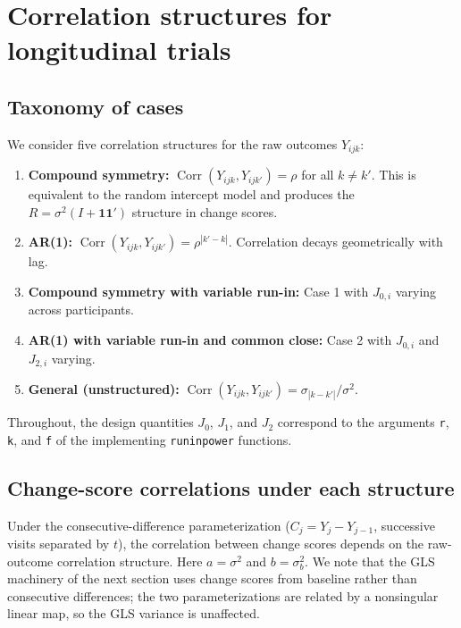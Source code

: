 \documentclass[
  11pt,
]{article}
\begin{document}
\section{Correlation structures for longitudinal trials}\label{correlation-structures-for-longitudinal-trials}

\subsection{Taxonomy of cases}\label{taxonomy-of-cases}

We consider five correlation structures for the
raw outcomes \(Y_{ijk}\):

\begin{enumerate}
\def\labelenumi{\arabic{enumi}.}
\item
  \textbf{Compound symmetry:}
  \(\mathop{\mathrm{Corr}}(Y_{ijk}, Y_{ijk'}) = \rho\) for all
  \(k \ne k'\). This is equivalent to the random
  intercept model and produces the \(R = \sigma^2(I +
  \mathbf{1}\mathbf{1}')\) structure in change scores.
\item
  \textbf{AR(1):}
  \(\mathop{\mathrm{Corr}}(Y_{ijk}, Y_{ijk'}) = \rho^{|k'-k|}\).
  Correlation decays geometrically with lag.
\item
  \textbf{Compound symmetry with variable run-in:}
  Case 1 with \(J_{0,i}\) varying across participants.
\item
  \textbf{AR(1) with variable run-in and common close:}
  Case 2 with \(J_{0,i}\) and \(J_{2,i}\) varying.
\item
  \textbf{General (unstructured):}
  \(\mathop{\mathrm{Corr}}(Y_{ijk}, Y_{ijk'}) = \sigma_{|k-k'|}/\sigma^2\).
\end{enumerate}

Throughout, the design quantities \(J_0\), \(J_1\), and
\(J_2\) correspond to the arguments \texttt{r}, \texttt{k}, and \texttt{f} of
the implementing \texttt{runinpower} functions.

\subsection{Change-score correlations under each structure}\label{change-score-correlations-under-each-structure}

Under the consecutive-difference parameterization
(\(C_j = Y_j - Y_{j-1}\), successive visits separated by
\(t\)), the correlation between change scores depends on
the raw-outcome correlation structure. Here \(a =
\sigma^2\) and \(b = \sigma_b^2\). We note that the GLS
machinery of the next section uses change scores from
baseline rather than consecutive differences; the two
parameterizations are related by a nonsingular linear
map, so the GLS variance is unaffected.
\end{document}

